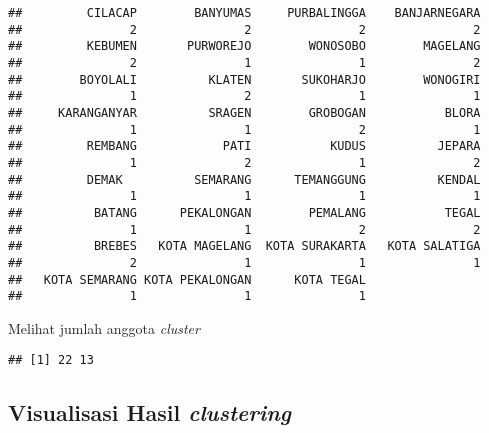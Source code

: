 \documentclass[
]{elegantbook}
\newenvironment{Shaded}{\begin{snugshade}}{\end{snugshade}}
\newcommand{\CommentTok}[1]{\textcolor[rgb]{0.56,0.35,0.01}{\textit{#1}}}
\newcommand{\NormalTok}[1]{#1}
\newcommand{\SpecialCharTok}[1]{\textcolor[rgb]{0.81,0.36,0.00}{\textbf{#1}}}
\begin{document}
\begin{verbatim}
##         CILACAP        BANYUMAS     PURBALINGGA    BANJARNEGARA 
##               2               2               2               2 
##         KEBUMEN       PURWOREJO        WONOSOBO        MAGELANG 
##               2               1               1               2 
##        BOYOLALI          KLATEN       SUKOHARJO        WONOGIRI 
##               1               2               1               1 
##     KARANGANYAR          SRAGEN        GROBOGAN           BLORA 
##               1               1               2               1 
##         REMBANG            PATI           KUDUS          JEPARA 
##               1               2               1               2 
##         DEMAK          SEMARANG      TEMANGGUNG          KENDAL 
##               1               1               1               1 
##          BATANG      PEKALONGAN        PEMALANG           TEGAL 
##               1               1               2               2 
##          BREBES   KOTA MAGELANG  KOTA SURAKARTA   KOTA SALATIGA 
##               2               1               1               1 
##   KOTA SEMARANG KOTA PEKALONGAN      KOTA TEGAL 
##               1               1               1
\end{verbatim}

Melihat jumlah anggota \emph{cluster}

\begin{Shaded}
\end{Shaded}

\begin{verbatim}
## [1] 22 13
\end{verbatim}

\hypertarget{visualisasi-hasil-clustering}{%
\subsection{\texorpdfstring{Visualisasi Hasil \emph{clustering}}{Visualisasi Hasil clustering}}\label{visualisasi-hasil-clustering}}

\begin{Shaded}
\end{Shaded}
\end{document}
